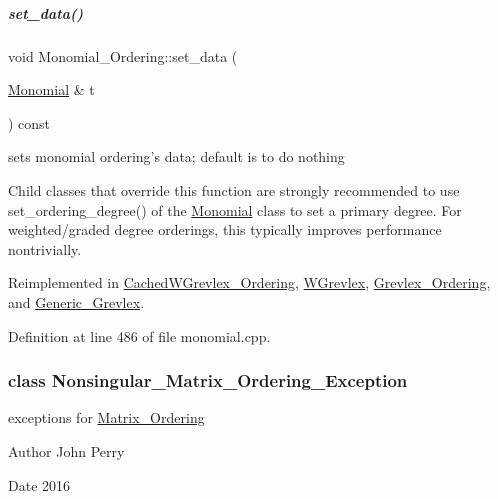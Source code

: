 \mbox{\label{group__orderinggroup_a22b08dffd1cdf3a655ca18d604cfcee1}} 
\subparagraph{\texorpdfstring{set\+\_\+data()}{set\_data()}}
{\footnotesize\ttfamily void Monomial\+\_\+\+Ordering\+::set\+\_\+data (\begin{DoxyParamCaption}\item[{\hyperlink{group__polygroup_class_monomial}{Monomial} \&}]{t }\end{DoxyParamCaption}) const\hspace{0.3cm}{\ttfamily [virtual]}}



sets monomial ordering's data; default is to do nothing 

Child classes that override this function are strongly recommended to use set\+\_\+ordering\+\_\+degree() of the \hyperlink{group__polygroup_class_monomial}{Monomial} class to set a primary degree. For weighted/graded degree orderings, this typically improves performance nontrivially. 

Reimplemented in \hyperlink{group__orderinggroup_a65f1e27ee52413c91ffcb87632dcb27c}{Cached\+W\+Grevlex\+\_\+\+Ordering}, \hyperlink{group__orderinggroup_a18ba60cd0a76da002303a11d362142d9}{W\+Grevlex}, \hyperlink{group__orderinggroup_a83abd3e7505fe2096b01b8146bfdd83f}{Grevlex\+\_\+\+Ordering}, and \hyperlink{group__orderinggroup_a14c344858da03d16c8019afdae3da5dc}{Generic\+\_\+\+Grevlex}.



Definition at line 486 of file monomial.\+cpp.

\label{class_nonsingular___matrix___ordering___exception}
\subsubsection{class Nonsingular\+\_\+\+Matrix\+\_\+\+Ordering\+\_\+\+Exception}
exceptions for \hyperlink{group__orderinggroup_class_matrix___ordering}{Matrix\+\_\+\+Ordering} 

\begin{DoxyAuthor}{Author}
John Perry 
\end{DoxyAuthor}
\begin{DoxyDate}{Date}
2016 
\end{DoxyDate}


